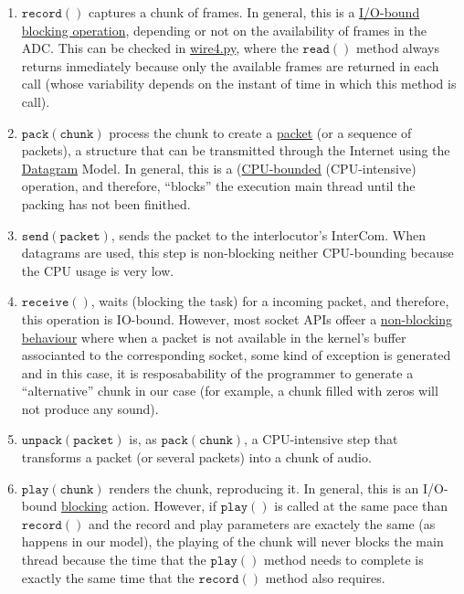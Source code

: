 \begin{enumerate}
\item $\mathtt{record()}$ captures a chunk of frames. In general, this
  is a \href{https://en.wikipedia.org/wiki/I/O_bound}{I/O-bound}
  \href{https://python-sounddevice.readthedocs.io/en/0.4.0/api/streams.html#sounddevice.Stream.read}{blocking
    operation}, depending or not on the availability of frames in the
  ADC. This can be checked in
  \href{https://raw.githubusercontent.com/Tecnologias-multimedia/intercom/master/test/sounddevice/wire4.py}{wire4.py},
  where the $\mathtt{read()}$ method always returns inmediately
  because only the available frames are returned in each call (whose
  variability depends on the instant of time in which this method is
  call).
\item $\mathtt{pack(chunk)}$ process the chunk to create a
  \href{https://en.wikipedia.org/wiki/Network_packet}{packet} (or a
  sequence of packets), a structure that can be transmitted through
  the Internet using the
  \href{https://en.wikipedia.org/wiki/Datagram}{Datagram} Model. In
  general, this is a
  (\href{https://en.wikipedia.org/wiki/CPU-bound}{CPU-bounded}
  (CPU-intensive) operation, and therefore, ``blocks'' the execution
  main thread until the packing has not been finithed.
\item $\mathtt{send(packet)}$, sends the packet to the
  interlocutor's InterCom. When datagrams are used, this step is
  non-blocking neither CPU-bounding because the
  CPU usage is very low.
\item $\mathtt{receive()}$, waits (blocking the task) for a incoming
  packet, and therefore, this operation is IO-bound. However, most
  socket APIs offeer a
  \href{https://docs.python.org/3.8/library/socket.html#socket.socket.setblocking}{non-blocking
    behaviour} where when a packet is not available in the kernel's
  buffer associanted to the corresponding socket, some kind of
  exception is generated and in this case, it is resposabability of
  the programmer to generate a ``alternative'' chunk in our case (for
  example, a chunk filled with zeros will not produce any sound).
\item $\mathtt{unpack(packet)}$ is, as $\mathtt{pack(chunk)}$, a
  CPU-intensive step that transforms a packet (or several packets)
  into a chunk of audio.
\item $\mathtt{play(chunk)}$ renders the chunk, reproducing it. In
  general, this is an I/O-bound
  \href{https://python-sounddevice.readthedocs.io/en/0.4.0/api/streams.html#sounddevice.Stream.write}{blocking}
  action. However, if $\mathtt{play()}$ is called at the same pace
  than $\mathtt{record()}$ and the record and play parameters are
  exactely the same (as happens in our model), the playing of the
  chunk will never blocks the main thread because the time that the
  $\mathtt{play()}$ method needs to complete is exactly the same time
  that the $\mathtt{record()}$ method also requires.
\end{enumerate}
  

